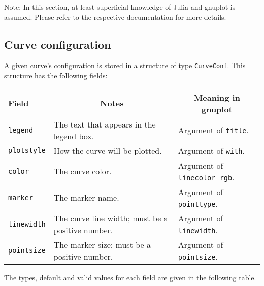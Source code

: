 \documentclass[11pt]{article}
\newcommand{\cmd}[1]{\texttt{#1}}
\begin{document}
Note: In this section, at least superficial knowledge of Julia and gnuplot is
assumed. Please refer to the respective documentation for more details.

\subsection{Curve configuration}

A given curve's configuration is stored in a structure of type \cmd{CurveConf}.
This structure has the following fields:

{\small
\begin{center}
\begin{tabular}{lll}
	\toprule
	\textbf{Field} & \multicolumn{1}{c}{\textbf{Notes}} &
	\multicolumn{1}{c}{\textbf{Meaning in gnuplot}} \\
	\midrule
	\cmd{legend} & The text that appears in the legend box. & Argument of
	\cmd{title}. \\
	\cmd{plotstyle} & How the curve will be plotted. & Argument of \cmd{with}.
	\\
	\cmd{color} & The curve color. & Argument of \cmd{linecolor rgb}. \\
	\cmd{marker} & The marker name. & Argument of \cmd{pointtype}. \\
	\cmd{linewidth} & The curve line width; must be a positive number. &
	Argument of \cmd{linewidth}. \\
	\cmd{pointsize} & The marker size; must be a positive number. & Argument
	of \cmd{pointsize}. \\
	\bottomrule
\end{tabular}
\end{center}}

The types, default and valid values for each field are given in the following
table.
\end{document}
